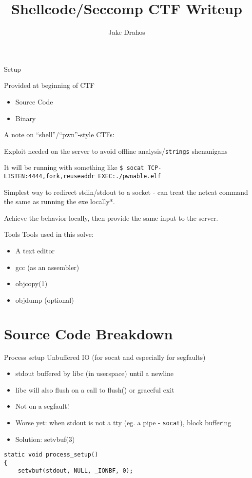 \documentclass{beamer}
\title{Shellcode/Seccomp CTF Writeup}
\author{Jake Drahos}
\begin{document}
\begin{frame}
{Setup}

Provided at beginning of CTF
\begin{itemize}
 \item Source Code
 \item Binary
\end{itemize}
\end{frame}

\begin{frame}
  A note on ``shell''/``pwn''-style CTFs:
  
  \pause
  Exploit needed on the server to avoid offline 
  analysis/{\tt strings} shenanigans
  
  It will be running with something like 
  {\tt \$ socat TCP-LISTEN:4444,fork,reuseaddr EXEC:./pwnable.elf }
  
  Simplest way to redirect stdin/stdout to a socket - can treat the 
  netcat command the same as running the exe locally*.
  
  Achieve the behavior locally, then provide the same input to the server.
  
\end{frame}

\begin{frame}
{Tools}
Tools used in this solve:
\begin{itemize}
 \item A text editor
 \item gcc (as an assembler)
 \item objcopy(1)
 \item objdump (optional)
\end{itemize}
\end{frame}

\section{Source Code Breakdown}

\begin{frame}[fragile]
{Process setup}
Unbuffered IO (for socat and especially for segfaults)

\begin{itemize}
 \item stdout buffered by libc (in userspace) until a newline
 \item libc will also flush on a call to flush() or graceful exit
 \item Not on a segfault!
 \item Worse yet: when stdout is not a tty (eg. a pipe - {\tt socat}), block buffering
 \item Solution: setvbuf(3)
\end{itemize}


    \begin{lstlisting}[firstnumber=41]
static void process_setup()
{
    setvbuf(stdout, NULL, _IONBF, 0);
    \end{lstlisting}
\end{frame}
\end{document}
